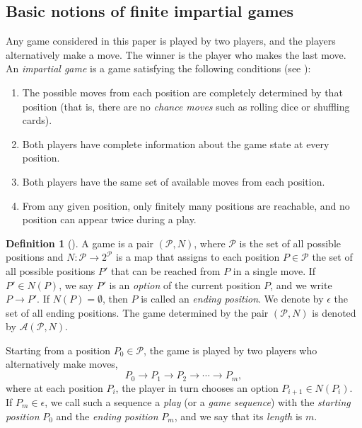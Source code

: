 \documentclass[a4paper,11pt]{amsart}
\theoremstyle{definition}
\newtheorem{dfn}{Definition}[section]
\numberwithin{equation}{section}
\def\P{\mathcal{P}}
\def\Game{\mathscr{A}}
\begin{document}
\subsection{Basic notions of finite impartial games}
Any game considered in this paper is played by two players,
and the players alternatively make a move. 
The winner is the player who makes the last move. 
An \textsl{impartial game} is a game satisfying the following conditions (see \cite{MHRG,Siegel}):
\begin{enumerate}[label=(\alph*)] %
		\item
			The possible moves from each position are completely determined by that position
			(that is, there are no \textsl{chance moves} such as rolling dice or shuffling cards).
		\item
			Both players have complete information about the game state at every position.
		\item
			Both players have the same set of available moves from each position.
		\item
			From any given position, only finitely many positions are reachable, and no position can appear twice during a play.
	\end{enumerate} %
%
\begin{dfn}[\cite{WW,ONAG,Lenstra,Sato,Siegel}]\label{def:game}
A game is a pair $(\P, N)$,
where $\P$ is the set of all possible positions
and $N:\P \to 2^{\P}$ is a map that assigns to each position $P\in\P$ 
the set of all possible positions $P'$ that can be reached from $P$ in a single move.
If $P'\in N(P)$,
we say $P'$  is an \textsl{option} of the current position $P$,
and we write $P \rightarrow P'$.
If $N(P)=\emptyset$,
then $P$ is called an \textsl{ending position}.
We denote by $\epsilon$ the set of all ending positions.
The game determined by the pair $(\P,N)$ is denoted by $\Game(\P,N)$.
\end{dfn}
%
	Starting from a position ${P}_{0}\in\P$,
	the game is played by two players who alternatively make moves,
	\[
	{P}_{0} \rightarrow {P}_{1} \rightarrow {P}_{2} \rightarrow \cdots \rightarrow {P}_{m},
	\]
	where at each position $P_i$, the player in turn chooses an option $P_{i+1}\in N(P_i)$.
If ${P}_{m}\in\epsilon$,
	we call such a sequence a \textsl{play} (or a \textsl{game sequence}) 
	with the \textsl{starting position} $P_{0}$
	and the \textsl{ending position} $P_{m}$,
	and we say that its \textsl{length} is $m$.
\end{document}

